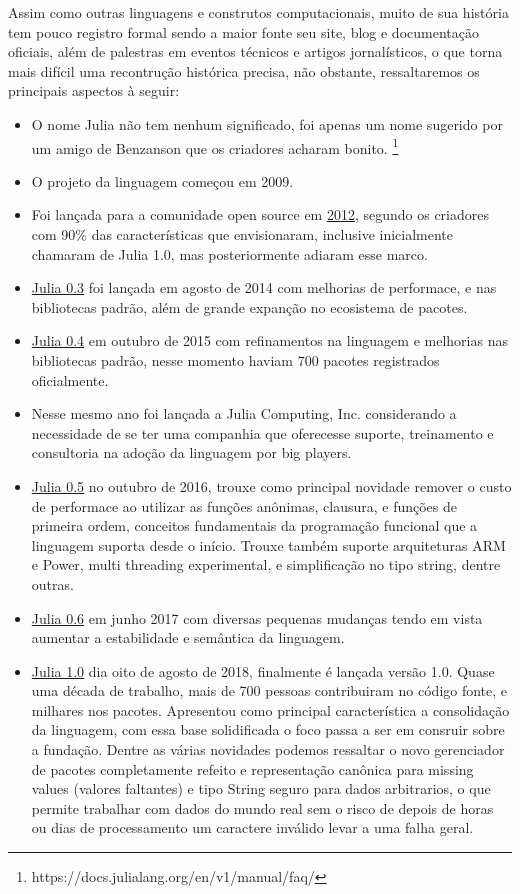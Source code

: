 Assim como outras linguagens e construtos computacionais, muito de sua história tem pouco registro formal sendo a maior fonte seu site, blog e documentação oficiais, além de palestras em eventos técnicos e artigos jornalísticos, o que torna mais difícil uma recontrução histórica precisa, não obstante, ressaltaremos os principais aspectos à seguir: 
\begin{itemize}
   \item O nome Julia não tem nenhum significado, foi apenas um nome sugerido por um amigo de Benzanson que os criadores acharam bonito. \footnote{https://docs.julialang.org/en/v1/manual/faq/}
   \item O projeto da linguagem começou em 2009.
   \item Foi lançada para a comunidade open source em \href{https://julialang.org/blog/2012/02/why-we-created-julia/}{2012}, segundo os criadores com 90\% das características que envisionaram, inclusive inicialmente chamaram de Julia 1.0, mas posteriormente adiaram esse marco. 
   \item \href{https://julialang.org/blog/2014/08/julia-0.3-release/}{Julia 0.3} foi lançada em agosto de 2014 com melhorias de performace, e nas bibliotecas padrão, além de grande expanção no ecosistema de pacotes. 
   \item \href{https://julialang.org/blog/2015/10/julia-0.4-release/}{Julia 0.4} em outubro de 2015 com refinamentos na linguagem e melhorias nas bibliotecas padrão, nesse momento haviam 700 pacotes registrados oficialmente.
   \item Nesse mesmo ano foi lançada a Julia Computing, Inc. considerando a necessidade de se ter uma companhia que oferecesse suporte, treinamento e consultoria na adoção da linguagem por big players. 
   \item \href{https://julialang.org/blog/2016/10/julia-0.5-release/}{Julia 0.5} no outubro de 2016, trouxe como principal novidade remover o custo de performace ao utilizar as funções anônimas, clausura, e funções de primeira ordem, conceitos fundamentais da programação funcional que a linguagem suporta desde o início. Trouxe também suporte arquiteturas ARM e Power, multi threading experimental, e simplificação no tipo string, dentre outras. 
   \item \href{https://julialang.org/blog/2017/06/julia-0.6-release/}{Julia 0.6} em junho 2017 com diversas pequenas mudanças tendo em vista aumentar a estabilidade e semântica da linguagem. 
   \item \href{https://julialang.org/blog/2018/08/one-point-zero/}{Julia 1.0}  dia oito de agosto de 2018, finalmente é lançada versão 1.0. Quase uma década de trabalho, mais de 700 pessoas contribuiram no código fonte, e milhares nos pacotes. Apresentou como principal característica a consolidação da linguagem, com essa base solidificada o foco passa a ser em consruir sobre a fundação. Dentre as várias novidades podemos ressaltar o novo gerenciador de pacotes completamente refeito e representação canônica para missing values (valores faltantes) e tipo String seguro para dados arbitrarios, o que permite trabalhar com dados do mundo real sem o risco de depois de horas ou dias de processamento um caractere inválido levar a uma falha geral. 

\end{itemize}
